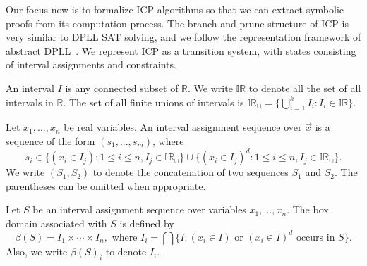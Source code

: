 \documentclass[envcountsect]{llncs}
\begin{document}
Our focus now is to formalize ICP algorithms so that we can extract symbolic proofs from
its computation process. The branch-and-prune structure of ICP is very similar
to DPLL SAT solving, and we follow the representation framework of abstract
DPLL~\cite{}. We represent ICP as a transition system, with states consisting of
interval assignments and constraints.
\begin{definition}[Intervals]
An interval $I$ is any connected subset of $\mathbb{R}$. We write $\mathbb{IR}$
to denote all the set of all intervals in $\mathbb{R}$. The set of all finite
unions of intervals is $\mathbb{IR}_{\cup} = \{\bigcup_{i=1}^k I_i:
I_i\in\mathbb{IR}\}.$
\end{definition}
\begin{definition}
Let $x_1,...,x_n$ be real variables. An interval assignment sequence over
$\vec x$ is a sequence of the form $(s_1,...,s_m)$, where
$$s_i\in \{(x_i\in I_j): 1\leq i\leq n, I_j\in
\mathbb{IR}_{\cup}\}\cup\{(x_i\in I_j)^d: 1\leq i\leq n, I_j\in
\mathbb{IR}_{\cup}\}.
$$
We write $(S_1, S_2)$ to denote the concatenation of two sequences $S_1$ and
$S_2$. The parentheses can be omitted when appropriate. 
\end{definition}
\begin{definition}
Let $S$ be an interval assignment sequence over variables $x_1,...,x_n$. The box
domain associated with $S$ is defined by
$$\beta(S) = I_1\times\cdots \times I_n, \mbox{ where }I_i = \bigcap\{ I:
(x_i\in
I)\mbox{ or } (x_i\in I)^d \mbox{ occurs in } S\}.$$
Also, we write $\beta(S)_i$ to denote $I_i$. 
\end{definition}
\end{document}
